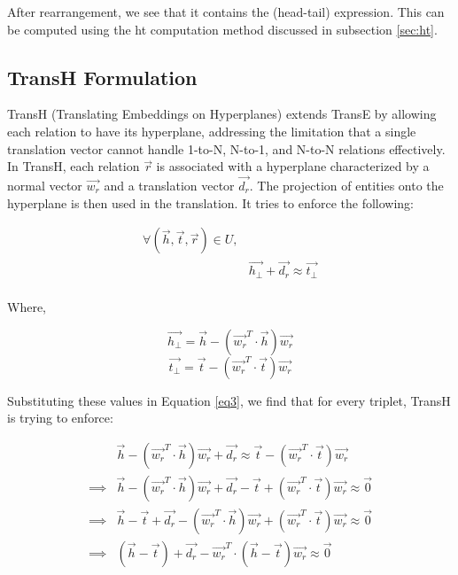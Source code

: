 After rearrangement, we see that it contains the (head-tail) expression. This can be computed using the ht computation method discussed in subsection \ref{sec:ht}.

\subsection{TransH Formulation}
\label{transh_formulation}
TransH (Translating Embeddings on Hyperplanes) extends TransE by allowing each relation to have its hyperplane, addressing the limitation that a single translation vector cannot handle 1-to-N, N-to-1, and N-to-N relations effectively. In TransH, each relation $\Vec{r}$ is associated with a hyperplane characterized by a normal vector $\Vec{w_r}$ and a translation vector $\Vec{d_r}$. The projection of entities onto the hyperplane is then used in the translation. It tries to enforce the following:


\begin{spacing}{0.2}
\begin{equation} \label{eq3}
\begin{split}
    \forall ( \Vec{h}, \Vec{t}, \Vec{r}) \in U, & \\
     & \Vec{h_{\perp}} + \Vec{d_r} \approx \Vec{t_{\perp}} \\
    \end{split}
\end{equation}
\end{spacing}

Where, 
\begin{spacing}{0.5}
$$\Vec{h_{\perp}} = \Vec{h} - (\Vec{w_r}^T\cdot \Vec{h})\Vec{w_r}$$
$$\Vec{t_{\perp}} = \Vec{t} - (\Vec{w_r}^T\cdot \Vec{t})\Vec{w_r}$$
\end{spacing}

Substituting these values in Equation \ref{eq3}, we find that for every triplet, TransH is trying to enforce:

\begin{spacing}{0.5}
\begin{equation*}
\begin{split}
    & \Vec{h} - (\Vec{w_r}^T\cdot \Vec{h})\Vec{w_r} + \Vec{d_r} \approx \Vec{t} - (\Vec{w_r}^T\cdot \Vec{t})\Vec{w_r}\\
    \implies & \Vec{h} - (\Vec{w_r}^T\cdot \Vec{h})\Vec{w_r} + \Vec{d_r} - \Vec{t} + (\Vec{w_r}^T\cdot \Vec{t})\Vec{w_r} \approx \Vec{0} \\
    \implies & \Vec{h} - \Vec{t} + \Vec{d_r} - (\Vec{w_r}^T\cdot \Vec{h})\Vec{w_r} + (\Vec{w_r}^T\cdot \Vec{t})\Vec{w_r} \approx \Vec{0} \\
    \implies & (\Vec{h} - \Vec{t}) + \Vec{d_r} - \Vec{w_r}^T\cdot(\Vec{h} - \Vec{t})\Vec{w_r} \approx \Vec{0} \\
    \end{split}
\end{equation*}
\end{spacing}

